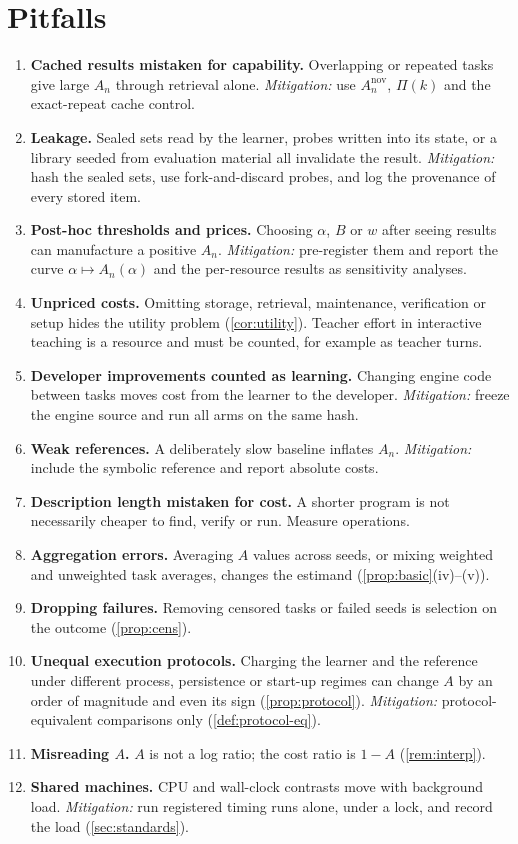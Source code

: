 \documentclass[11pt]{article}
\theoremstyle{remark}
\begin{document}
\section{Pitfalls}\label{sec:pitfalls}
\begin{enumerate}[leftmargin=*,itemsep=2pt]
\item \textbf{Cached results mistaken for capability.} Overlapping or repeated tasks give large $A_n$ through retrieval alone. \emph{Mitigation:} use $A_n^{\mathrm{nov}}$, $\Pi(k)$ and the exact-repeat cache control.
\item \textbf{Leakage.} Sealed sets read by the learner, probes written into its state, or a library seeded from evaluation material all invalidate the result. \emph{Mitigation:} hash the sealed sets, use fork-and-discard probes, and log the provenance of every stored item.
\item \textbf{Post-hoc thresholds and prices.} Choosing $\alpha$, $B$ or $w$ after seeing results can manufacture a positive $A_n$. \emph{Mitigation:} pre-register them and report the curve $\alpha\mapsto A_n(\alpha)$ and the per-resource results as sensitivity analyses.
\item \textbf{Unpriced costs.} Omitting storage, retrieval, maintenance, verification or setup hides the utility problem (\cref{cor:utility}). Teacher effort in interactive teaching is a resource and must be counted, for example as teacher turns.
\item \textbf{Developer improvements counted as learning.} Changing engine code between tasks moves cost from the learner to the developer. \emph{Mitigation:} freeze the engine source and run all arms on the same hash.
\item \textbf{Weak references.} A deliberately slow baseline inflates $A_n$. \emph{Mitigation:} include the symbolic reference and report absolute costs.
\item \textbf{Description length mistaken for cost.} A shorter program is not necessarily cheaper to find, verify or run. Measure operations.
\item \textbf{Aggregation errors.} Averaging $A$ values across seeds, or mixing weighted and unweighted task averages, changes the estimand (\cref{prop:basic}(iv)--(v)).
\item \textbf{Dropping failures.} Removing censored tasks or failed seeds is selection on the outcome (\cref{prop:cens}).
\item \textbf{Unequal execution protocols.} Charging the learner and the reference under different process, persistence or start-up regimes can change $A$ by an order of magnitude and even its sign (\cref{prop:protocol}). \emph{Mitigation:} protocol-equivalent comparisons only (\cref{def:protocol-eq}).
\item \textbf{Misreading $A$.} $A$ is not a log ratio; the cost ratio is $1-A$ (\cref{rem:interp}).
\item \textbf{Shared machines.} CPU and wall-clock contrasts move with background load. \emph{Mitigation:} run registered timing runs alone, under a lock, and record the load (\cref{sec:standards}).
\end{enumerate}
\end{document}
